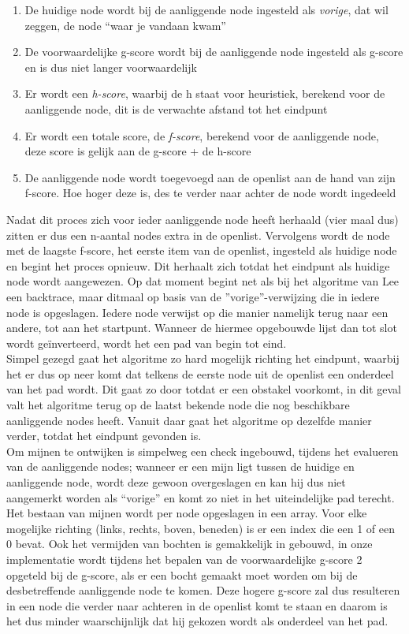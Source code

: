 \documentclass{report}
\begin{document}
\begin{enumerate}
	\item De huidige node wordt bij de aanliggende node ingesteld als \textit{vorige}, dat wil zeggen, de node ``waar je vandaan kwam''
	\item De voorwaardelijke g-score wordt bij de aanliggende node ingesteld als g-score en is dus niet langer voorwaardelijk
	\item Er wordt een \textit{h-score}, waarbij de h staat voor heuristiek, berekend voor de aanliggende node, dit is de verwachte afstand tot het eindpunt
	\item Er wordt een totale score, de \textit{f-score}, berekend voor de aanliggende node, deze score is gelijk aan de g-score + de h-score
	\item De aanliggende node wordt toegevoegd aan de openlist aan de hand van zijn f-score. Hoe hoger deze is, des te verder naar achter de node wordt ingedeeld
\end{enumerate}

Nadat dit proces zich voor ieder aanliggende node heeft herhaald (vier maal dus) zitten er dus een n-aantal nodes extra in de openlist.
Vervolgens wordt de node met de laagste f-score, het eerste item van de openlist, ingesteld als huidige node en begint het proces opnieuw.
Dit herhaalt zich totdat het eindpunt als huidige node wordt aangewezen.
Op dat moment begint net als bij het algoritme van Lee een backtrace, maar ditmaal op basis van de ''vorige''-verwijzing die in iedere node is opgeslagen.
Iedere node verwijst op die manier namelijk terug naar een andere, tot aan het startpunt.
Wanneer de hiermee opgebouwde lijst dan tot slot wordt geïnverteerd, wordt het een pad van begin tot eind.
\\

Simpel gezegd gaat het algoritme zo hard mogelijk richting het eindpunt, waarbij het er dus op neer komt dat telkens de eerste node uit de openlist een onderdeel van het pad wordt.
Dit gaat zo door totdat er een obstakel voorkomt, in dit geval valt het algoritme terug op de laatst bekende node die nog beschikbare aanliggende nodes heeft.
Vanuit daar gaat het algoritme op dezelfde manier verder, totdat het eindpunt gevonden is.
\\

Om mijnen te ontwijken is simpelweg een check ingebouwd, tijdens het evalueren van de aanliggende nodes; wanneer er een mijn ligt tussen de huidige en aanliggende node, wordt deze gewoon overgeslagen en kan hij dus niet aangemerkt worden als ``vorige'' en komt zo niet in het uiteindelijke pad terecht.
Het bestaan van mijnen wordt per node opgeslagen in een array.
Voor elke mogelijke richting (links, rechts, boven, beneden) is er een index die een 1 of een 0 bevat.
Ook het vermijden van bochten is gemakkelijk in gebouwd, in onze implementatie wordt tijdens het bepalen van de voorwaardelijke g-score 2 opgeteld bij de g-score, als er een bocht gemaakt moet worden om bij de desbetreffende aanliggende node te komen.
Deze hogere g-score zal dus resulteren in een node die verder naar achteren in de openlist komt te staan en daarom is het dus minder waarschijnlijk dat hij gekozen wordt als onderdeel van het pad.
\\
\end{document}
